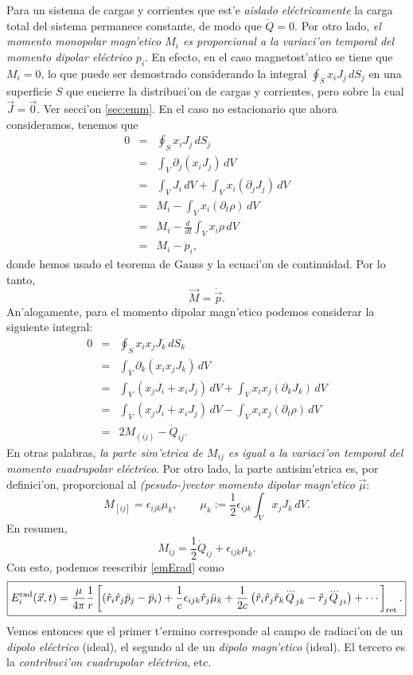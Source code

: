 Para un sistema de cargas y corrientes que est'e \textit{aislado eléctricamente} la carga total del sistema permanece constante, de modo que $\dot{Q}=0$. Por otro lado, \textit{el momento monopolar magn'etico $M_i$ es proporcional a la variaci'on temporal del momento dipolar eléctrico $p_i$}. En efecto, en el caso magnetost'atico se tiene que $M_i=0$, lo que puede ser demostrado considerando la integral $\oint_Sx_iJ_j\, dS_j$ en una superficie $S$ que encierre la distribuci'on de cargas y corrientes, pero sobre la cual $\vec{J}=\vec{0}$. Ver secci'on \ref{sec:emm}. En el caso no estacionario que ahora consideramos, tenemos que
\begin{eqnarray}
 0&=&\oint_Sx_iJ_j\, dS_j\\
&=&\int_V\partial_j(x_iJ_j)\,dV \\
&=&\int_VJ_i\,dV+\int_Vx_i(\partial_jJ_j)\,dV \\
&=&M_i-\int_Vx_i(\partial_t\rho)\,dV \\
&=&M_i-\frac{d\ }{dt}\int_Vx_i\rho\,dV \\
&=&M_i-\dot{p}_i,
\end{eqnarray}
donde hemos usado el teorema de Gauss y la ecuaci'on de continuidad. Por lo tanto,
\begin{equation}
 \vec{M}=\dot{\vec{p}}.
\end{equation}
An'alogamente, para el momento dipolar magn'etico podemos considerar la siguiente integral:
\begin{eqnarray}
 0&=&\oint_Sx_ix_jJ_k\, dS_k\\
&=&\int_V\partial_k(x_ix_jJ_k)\,dV \\
&=&\int_V(x_jJ_i+x_iJ_j)\,dV+\int_Vx_ix_j(\partial_kJ_k)\,dV \\
&=&\int_V(x_jJ_i+x_iJ_j)\,dV-\int_Vx_ix_j(\partial_t\rho)\,dV \\
&=&2M_{(ij)}-\dot{Q}_{ij}.
\end{eqnarray}
En otras palabras, \textit{la parte sim'etrica de $M_{ij}$ es igual a la variaci'on temporal del momento cuadrupolar eléctrico}. Por otro lado, la parte antisim'etrica es, por definici'on, proporcional al \textit{(pesudo-)vector momento dipolar magn'etico} $\vec{\mu}$:
\begin{equation}
 M_{[ij]}=\epsilon_{ijk}\mu_k, \qquad \mu_k:=\frac{1}{2}\epsilon_{ijk}\int_Vx_jJ_k\,dV.
\end{equation}
En resumen,
\begin{equation}
 M_{ij}=\frac{1}{2}\dot{Q}_{ij}+\epsilon_{ijk}\mu_k.
\end{equation}
Con esto, podemos reescribir \eqref{emErad} como
\begin{equation}
\boxed{E_i^{\rm rad}(\vec{x},t)=\frac{\mu}{4\pi}\frac{1}{r}\left[\left(\hat{r}_i\hat{r}_j\ddot{p}_j-\ddot{p}_i\right)+\frac{1}{c}\epsilon_{ijk}\hat{r}_j\ddot{\mu}_k+\frac{1}{2c}\left(\hat{r}_i\hat{r}_j\hat{r}_k\dddot{Q}_{jk} -\hat{r}_j\dddot{Q}_{ji}\right)+\cdots\right]_{\rm ret} .} \label{emErad2}
\end{equation}
Vemos entonces que el primer t'ermino corresponde al campo de radiaci'on de un \textit{dipolo eléctrico} (ideal), el segundo al de un \textit{dipolo magn'etico} (ideal). El tercero es la \textit{contribuci'on cuadrupolar eléctrica}, etc.

